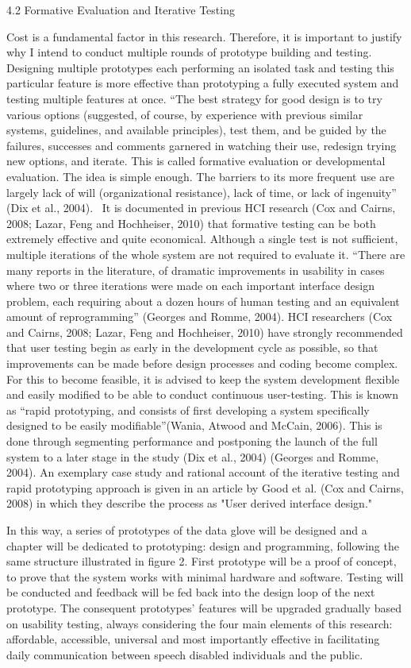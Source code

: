 4.2 Formative Evaluation and Iterative Testing

Cost is a fundamental factor in this research. Therefore, it is important to justify why I intend to conduct multiple rounds of prototype building and testing.  Designing multiple prototypes each performing an isolated task and testing this particular feature is more effective than prototyping a fully executed system and testing multiple features at once. 
 “The best strategy for good design is to try various options (suggested, of course, by experience with previous similar systems, guidelines, and available principles), test them, and be guided by the failures, successes and comments garnered in watching their use, redesign trying new options, and iterate. This is called formative evaluation or developmental evaluation. The idea is simple enough. The barriers to its more frequent use are largely lack of will (organizational resistance), lack of time, or lack of ingenuity” (Dix et al., 2004). 
It is documented in previous HCI research (Cox and Cairns, 2008; Lazar, Feng and Hochheiser, 2010) that formative testing can be both extremely effective and quite economical.  Although a single test is not sufficient, multiple iterations of the whole system are not required to evaluate it. “There are many reports in the literature, of dramatic improvements in usability in cases where two or three iterations were made on each important interface design problem, each requiring about a dozen hours of human testing and an equivalent amount of reprogramming” (Georges and Romme, 2004).
HCI researchers (Cox and Cairns, 2008; Lazar, Feng and Hochheiser, 2010) have strongly recommended that user testing begin as early in the development cycle as possible, so that improvements can be made before design processes and coding become complex. For this to become feasible, it is advised to keep the system development flexible and easily modified to be able to conduct continuous user-testing. This is known as “rapid prototyping, and consists of first developing a system specifically designed to be easily modifiable”(Wania, Atwood and McCain, 2006).  This is done through segmenting performance and postponing the launch of the full system to a later stage in the study (Dix et al., 2004) (Georges and Romme, 2004).
An exemplary case study and rational account of the iterative testing and rapid prototyping approach is given in an article by Good et al. (Cox and Cairns, 2008) in which they describe the process as "User derived interface design." 

In this way, a series of prototypes of the data glove will be designed and a chapter will be dedicated to prototyping: design and programming, following the same structure illustrated in figure 2.  First prototype will be a proof of concept, to prove that the system works with minimal hardware and software.  Testing will be conducted and feedback will be fed back into the design loop of the next prototype.  The consequent prototypes’ features will be upgraded gradually based on usability testing, always considering the four main elements of this research: affordable, accessible, universal and most importantly effective in facilitating daily communication between speech disabled individuals and the public. 

